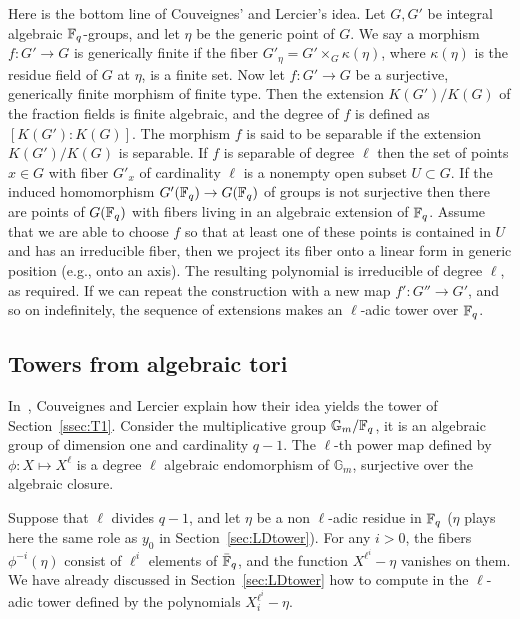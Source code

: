 \documentclass{sig-alternate}
\begin{document}
Here is the bottom line of Couveignes' and Lercier's idea. Let $G, G'$ be integral algebraic 
$\mathbb{F}_q$-groups, and let $\eta$ be the generic point of $G$. We say a morphism $f: G' \rightarrow 
G$ is generically finite if the fiber $G'_\eta = G' \times_{G} \kappa(\eta)$, where $\kappa(\eta)$ 
is the residue field of $G$ at $\eta$, is a finite set. Now let $f: G' \rightarrow G$ be a 
surjective, generically finite morphism of finite type. Then the extension $K(G')/K(G)$ of the 
fraction fields is finite algebraic, and the degree of $f$ is defined as $[K(G'): K(G)]$. The 
morphism $f$ is said to be separable if the extension $K(G')/K(G)$ is separable. If $f$ is 
separable of degree $\ell$ then the set of points $x \in G$ with fiber $G'_x$ of cardinality 
$\ell$ is a nonempty open subset $U \subset G$. If the induced homomorphism $G'(\mathbb{F}_q) \rightarrow 
G(\mathbb{F}_q)$ of groups is not surjective then there are points of $G(\mathbb{F}_q)$ with fibers living in an 
algebraic extension of $\mathbb{F}_q$. Assume that we are able to choose $f$ so that at least one of these 
points is contained in $U$ and has an irreducible fiber, then we project its fiber onto a linear 
form in generic position (e.g., onto an axis). The resulting polynomial is irreducible of degree 
$\ell$, as required. If we can repeat the construction with a new map $f':G''\to G'$, and so on 
indefinitely, the sequence of extensions makes an $\ell$-adic tower over $\mathbb{F}_q$.






\subsection{Towers from algebraic tori}
\label{ssec:fibers-T2}
In~\cite{couveignes+lercier11}, Couveignes and Lercier explain how
their idea yields the tower of Section~\ref{ssec:T1}. Consider the
multiplicative group $\mathbb{G}_m/\mathbb{F}_q$, it is an algebraic group of
dimension one and cardinality $q-1$.  The $\ell$-th power map defined
by $\phi:X\mapsto X^\ell$ is a degree $\ell$ algebraic endomorphism of
$\mathbb{G}_m$, surjective over the algebraic closure.

Suppose that $\ell$ divides $q-1$, and let $\eta$ be a non $\ell$-adic
residue in $\mathbb{F}_q$ ($\eta$ plays here the same role as $y_0$ in
Section~\ref{sec:LDtower}). For any $i>0$, the fibers
$\phi^{-i}(\eta)$ consist of $\ell^i$ elements of $\bar{\mathbb{F}}_q$, and
the function $X^{\ell^i}-\eta$ vanishes on them. We have already
discussed in Section~\ref{sec:LDtower} how to compute in the
$\ell$-adic tower defined by the polynomials $X_i^{\ell^i}-\eta$.
\end{document}
